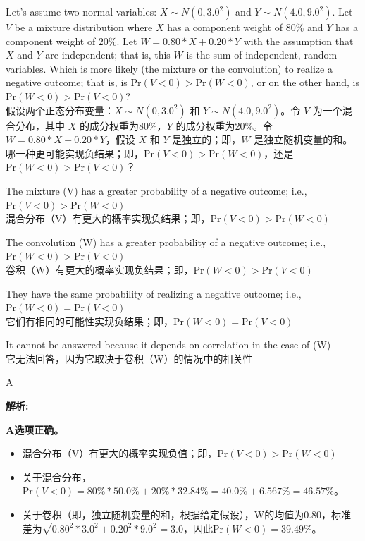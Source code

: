 \documentclass{article}
\newcounter{question} %
\newenvironment{explanation}
{\textbf{解析:}\par}
{\par}
\begin{document}
\begin{question}
    Let's assume two normal variables: $X \sim N(0, 3.0^2)$ and $Y \sim N(4.0, 9.0^2)$. Let $V$ be a mixture distribution where $X$ has a component weight of $80\%$ and $Y$ has a component weight of $20\%$. Let $W = 0.80*X + 0.20*Y$ with the assumption that $X$ and $Y$ are independent; that is, this $W$ is the sum of independent, random variables. Which is more likely (the mixture or the convolution) to realize a negative outcome; that is, is $\text{Pr}(V<0) > \text{Pr}(W<0)$, or on the other hand, is $\text{Pr}(W<0) > \text{Pr}(V<0)$?
    \\假设两个正态分布变量：$X \sim N(0, 3.0^2)$ 和 $Y \sim N(4.0, 9.0^2)$。令 $V$ 为一个混合分布，其中 $X$ 的成分权重为80\%，$Y$ 的成分权重为20\%。令 $W = 0.80*X + 0.20*Y$，假设 $X$ 和 $Y$ 是独立的；即，$W$ 是独立随机变量的和。哪一种更可能实现负结果；即，$\text{Pr}(V<0) > \text{Pr}(W<0)$，还是$\text{Pr}(W<0) > \text{Pr}(V<0)$？
\end{question}

\begin{choices}
    \item The mixture (V) has a greater probability of a negative outcome; i.e., $\text{Pr}(V<0) > \text{Pr}(W<0)$
    \\混合分布（V）有更大的概率实现负结果；即，$\text{Pr}(V<0) > \text{Pr}(W<0)$
    \item The convolution (W) has a greater probability of a negative outcome; i.e., $\text{Pr}(W<0) > \text{Pr}(V<0)$
    \\卷积（W）有更大的概率实现负结果；即，$\text{Pr}(W<0) > \text{Pr}(V<0)$
    \item They have the same probability of realizing a negative outcome; i.e., $\text{Pr}(W<0) = \text{Pr}(V<0)$
    \\它们有相同的可能性实现负结果；即，$\text{Pr}(W<0) = \text{Pr}(V<0)$
    \item It cannot be answered because it depends on correlation in the case of (W)
    \\它无法回答，因为它取决于卷积（W）的情况中的相关性
\end{choices}

\begin{correctanswer}
A
\end{correctanswer}

\begin{explanation}
    \textbf{A选项正确。} 
    \begin{itemize}
        \item 混合分布（V）有更大的概率实现负值；即，$\text{Pr}(V<0) > \text{Pr}(W<0)$
    \end{itemize}
    \begin{itemize}
        \item 关于混合分布，$\text{Pr}(V < 0) = 80\%*50.0\% + 20\%*32.84\% = 40.0\% + 6.567\% = 46.57\%$。
        \item 关于卷积（即，独立随机变量的和，根据给定假设），W的均值为$0.80$，标准差为$\sqrt{0.80^2*3.0^2 + 0.20^2*9.0^2} = 3.0$，因此$\text{Pr}(W < 0) = 39.49\%$。
    \end{itemize}
\end{explanation}
\end{document}
